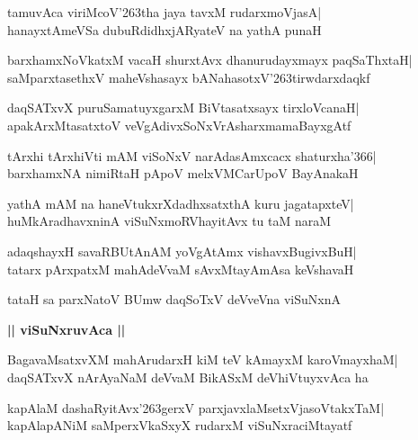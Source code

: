 \documentclass[twoside,12pt,openright]{book}
\def\S{\char'263}
\newcounter{shloka}[chapter]
\def\uvaca#1{\centerline{{\large\textbf{#1}}}}
\begin{document}
\begin{shloka}%
tamuvAca viriMcoV\S tha jaya tavxM rudarxmoVjasA|\\
hanayxtAmeVSa dubuRdidhxjARyateV na yathA punaH
\end{shloka}

\begin{shloka}%
barxhamxNoVkatxM vacaH shurxtAvx dhanurudayxmayx paqSaThxtaH|\\
saMparxtasethxV maheVshasayx bANahasotxV\S tirwdarxdaqkf
\end{shloka}

\begin{shloka}%
daqSATxvX puruSamatuyxgarxM BiVtasatxsayx tirxloVcanaH|\\
apakArxMtasatxtoV veVgAdivxSoNxVrAsharxmamaBayxgAtf
\end{shloka}

\begin{shloka}%
tArxhi tArxhiVti mAM viSoNxV narAdasAmxcacx shaturxha\char'366|\\
barxhamxNA nimiRtaH pApoV melxVMCarUpoV BayAnakaH
\end{shloka}

\begin{shloka}%
yathA mAM na haneVtukxrXdadhxsatxthA kuru jagatapxteV|\\
huMkAradhavxninA viSuNxmoRVhayitAvx tu taM naraM
\end{shloka}

\begin{shloka}%
adaqshayxH savaRBUtAnAM yoVgAtAmx vishavxBugivxBuH|\\
tatarx pArxpatxM mahAdeVvaM sAvxMtayAmAsa keVshavaH
\end{shloka}

\begin{shloka}%
tataH sa parxNatoV BUmw daqSoTxV deVveVna viSuNxnA
\end{shloka}

\uvaca{|| viSuNxruvAca ||}
\begin{shloka}%
BagavaMsatxvXM mahArudarxH kiM teV kAmayxM karoVmayxhaM|\\
daqSATxvX nArAyaNaM deVvaM BikASxM deVhiVtuyxvAca ha
\end{shloka}

\begin{shloka}%
kapAlaM dashaRyitAvx\S gerxV parxjavxlaMsetxVjasoVtakxTaM|\\
kapAlapANiM saMperxVkaSxyX rudarxM viSuNxraciMtayatf
\end{shloka}
\end{document}
